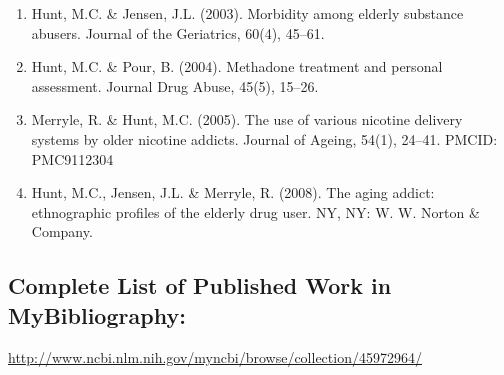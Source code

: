 \documentclass{nihbiosketch}
\begin{document}
\begin{enumerate}
\begin{enumerate}
\item Hunt, M.C. \& Jensen, J.L. (2003). Morbidity among elderly substance
        abusers. Journal of the Geriatrics, 60(4), 45--61.

\item Hunt, M.C. \& Pour, B. (2004). Methadone treatment and personal
        assessment. Journal Drug Abuse, 45(5), 15--26. 

\item  Merryle, R. \& Hunt, M.C. (2005). The use of various nicotine delivery
        systems by older nicotine addicts. Journal of Ageing, 54(1), 24--41.
        PMCID: PMC9112304

\item Hunt, M.C., Jensen, J.L. \& Merryle, R. (2008). The aging addict:
        ethnographic profiles of the elderly drug user.  NY, NY: W. W. Norton
        \& Company.

\end{enumerate}

\end{enumerate}

\subsection*{Complete List of Published Work in MyBibliography:} 
\url{http://www.ncbi.nlm.nih.gov/myncbi/browse/collection/45972964/}
\end{document}
